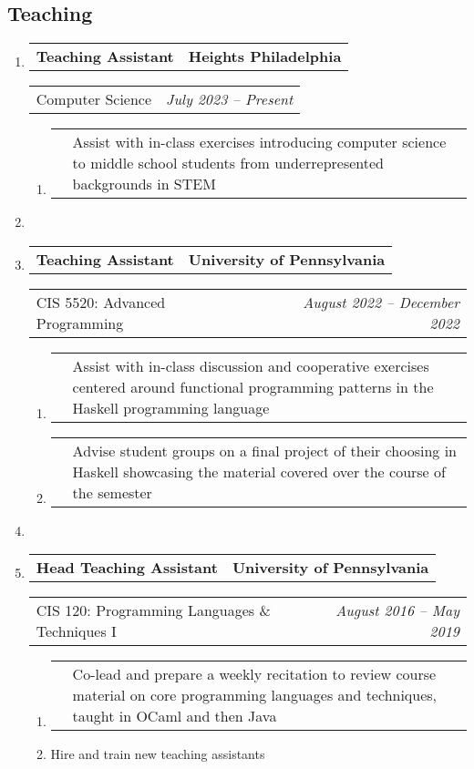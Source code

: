 \documentclass[letterpaper]{article}
\makeatletter
\newcommand*{\tabulardef}[3]{\begin{tabular}[t]{@{}lp{\dimexpr\linewidth-#1}@{}}
    #2&#3
\end{tabular}}
\newcommand{\headerrow}[2]
{\begin{tabular*}{\linewidth}{l@{\extracolsep{\fill}}r}
	#1 &
	#2 \\
\end{tabular*}}
\makeatother
\begin{document}
\subsection*{Teaching}
\begin{enumerate}[label=]
	\parskip=-0.25em

    \item
		\headerrow
			{\textbf{Teaching Assistant}}
			{\textbf{Heights Philadelphia}}
	\headerrow
		{Computer Science}
		{\emph{July 2023 -- Present}}
	\begin{enumerate}[label= *]
		\parskip=-0.1em
    \item\tabulardef{5cm}{}{Assist with in-class exercises introducing computer science to middle school students from underrepresented backgrounds in STEM}
	\end{enumerate}

    \item

	\item
		\headerrow
			{\textbf{Teaching Assistant}}
			{\textbf{University of Pennsylvania}}
	\headerrow
		{CIS 5520: Advanced Programming}
		{\emph{August 2022 -- December 2022}}
	\begin{enumerate}[label= *]
		\parskip=-0.1em
        \item\tabulardef{5cm}{}{Assist with in-class discussion and cooperative exercises centered around functional programming patterns in the Haskell programming language}        
        \item\tabulardef{5cm}{}{Advise student groups on a final project of their choosing in Haskell showcasing the material covered over the course of the semester}
	\end{enumerate}

     \item

	\item
		\headerrow
			{\textbf{Head Teaching Assistant}}
			{\textbf{University of Pennsylvania}}
	\headerrow
		{CIS 120: Programming Languages \& Techniques I}
		{\emph{August 2016 -- May 2019}}
	\begin{enumerate}[label= *]
		\parskip=-0.1em
        \item\tabulardef{5cm}{}{Co-lead and prepare a weekly recitation to review course material on core programming languages and techniques, taught in OCaml and then Java}
		\item Hire and train new teaching assistants
	\end{enumerate}
\end{enumerate}
\end{document}
